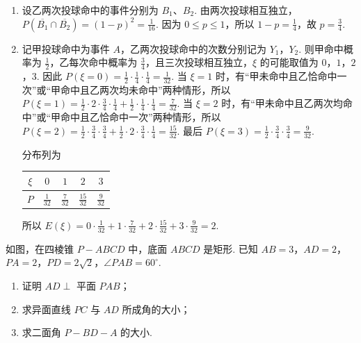 \begin{solution}
\begin{enumerate}
\item
设乙两次投球命中的事件分别为 \(B_1\)、\(B_2\). 由两次投球相互独立，\(P(\overline{B_1}\cap\overline{B_2})=(1-p)^2=\frac1{16}\).
因为 \(0\leqslant p\leqslant1\)，所以 \(1-p=\frac14\)，故 \(p=\frac34\).

\item
记甲投球命中为事件 \(A\)，乙两次投球命中的次数分别记为 \(Y_1\)，\(Y_2\). 则甲命中概率为 \(\frac12\)，乙每次命中概率为 \(\frac34\)，且三次投球相互独立，\(\xi\) 的可能取值为 \(0\)，\(1\)，\(2\)，\(3\). 因此
\(P(\xi=0)=\frac12\cdot\frac14\cdot\frac14=\frac1{32}\). 当 \(\xi=1\) 时，有“甲未命中且乙恰命中一次”或“甲命中且乙两次均未命中”两种情形，所以 \(P(\xi=1)=\frac12\cdot2\cdot\frac34\cdot\frac14+\frac12\cdot\frac14\cdot\frac14=\frac7{32}\). 当 \(\xi=2\) 时，有“甲未命中且乙两次均命中”或“甲命中且乙恰命中一次”两种情形，所以 \(P(\xi=2)=\frac12\cdot\frac34\cdot\frac34+\frac12\cdot2\cdot\frac34\cdot\frac14=\frac{15}{32}\). 最后 \(P(\xi=3)=\frac12\cdot\frac34\cdot\frac34=\frac9{32}\).

分布列为
\begin{center}
\begin{tabular}{c|cccc}
\hline
\(\xi\) & \(0\) & \(1\) & \(2\) & \(3\) \\
\hline
\(P\) & \(\frac1{32}\) & \(\frac7{32}\) & \(\frac{15}{32}\) & \(\frac9{32}\) \\
\hline
\end{tabular}
\end{center}

所以
\(E(\xi)=0\cdot\frac1{32}+1\cdot\frac7{32}+2\cdot\frac{15}{32}+3\cdot\frac9{32}=2\).
\end{enumerate}
\end{solution}

\begin{problem}
如图，在四棱锥 \(P - ABCD\) 中，底面 \(ABCD\) 是矩形. 已知 \(AB = 3\)，\(AD = 2\)，\(PA = 2\)，\(PD = 2\sqrt{2}\)，\(\angle PAB = 60^{\circ}\).

\begin{enumerate}
\item 证明 \(AD \perp\) 平面 \(PAB\)；
\item 求异面直线 \(PC\) 与 \(AD\) 所成角的大小；
\item 求二面角 \(P - BD - A\) 的大小.
\end{enumerate}

\end{problem}

